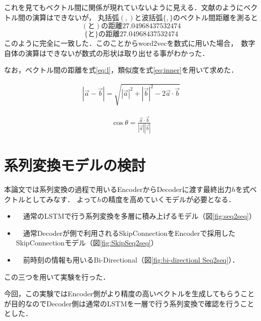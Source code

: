 \documentclass[a4j,11pt,report]{jsbook}
\begin{document}
これを見てもベクトル間に関係が現れていないように見える．文献\cite{seq2seq}のようにベクトル間の演算はできないが，
丸括弧$( , )$と波括弧$\{ , \}$のベクトル間距離を測ると
\[
(　と　) の距離 27.04968437532474
\]
\[
\{　と　\} の距離 27.04968437532474
\]
このように完全に一致した．このことからword2vecを数式に用いた場合，　数字自体の演算はできないが数式の形状は取り出せる事がわかった．

なお，ベクトル間の距離を式\ref{eq:l}，類似度を式\ref{eq:inner}を用いて求めた．

\begin{equation}
  \label{eq:l}
  \begin{split}
    |\vec{a}-\vec{b}| =  \sqrt{|\vec{a}|^2 + |\vec{b}|^2 - 2  \vec{a} \cdot \vec{b}}
  \end{split}
\end{equation}

\begin{equation}
  \label{eq:inner}
  \begin{split}
    \cos \theta = \frac{\vec{a} \cdot \vec{b}}{|\vec{a}| |\vec{b}|}
  \end{split}
\end{equation}

\section{系列変換モデルの検討}
本論文では系列変換の過程で用いるEncoderからDecoderに渡す最終出力$h$を式ベクトルとしてみなす．
よって$h$の精度を高めていくモデルが必要となる．
\begin{itemize}
  \item　通常のLSTMで行う系列変換を多層に積み上げるモデル（図\ref{fig:seq2seq}）
  \item　通常Decoderが側で利用されるSkipConnectionをEncoderで採用したSkipConnectionモデル（図\ref{fig:SkipSeq2seq}）
  \item　前時刻の情報も用いるBi-Directional（図\ref{fig:bi-directionl Seq2seq}）．

\end{itemize}
この三つを用いて実験を行った．

今回，この実験ではEncoder側がより精度の高いベクトルを生成してもらうことが目的なのでDecoder側は通常のLSTMを一層で行う系列変換で確認を行うこととした．
\end{document}
